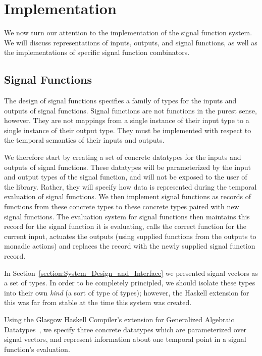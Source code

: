 \section{Implementation}
\label{section:Implementation}

We now turn our attention to the implementation of the signal function
system. We will discuss representations of inputs, outputs, and signal functions,
as well as the implementations of specific signal function combinators.

\subsection{Signal Functions}
\label{subsection:Implementation-Signal_Functions}

The design of signal functions specifies a family of types for the inputs and
outputs of signal functions. Signal functions are not functions in the purest
sense, however. They are not mappings from a single instance of their input
type to a single instance of their output type. They must be implemented with
respect to the temporal semantics of their inputs and outputs.

We therefore start by creating a set of concrete datatypes for the inputs and
outputs of signal functions. These datatypes will be parameterized by the input
and output types of the signal function, and will not be exposed to the user of
the library. Rather, they will specify how data is represented during the
temporal evaluation of signal functions. We then implement signal functions
as records of functions from these concrete types to these concrete types paired
with new signal functions. The evaluation system for signal functions then
maintains this record for the signal function it is evaluating, calls the
correct function for the current input, actuates the outputs (using supplied
functions from the outputs to monadic actions) and replaces the record with the
newly supplied signal function record.

In Section~\ref{section:System_Design_and_Interface} we presented signal vectors
as a set of types. In order to be completely principled, we should isolate these
types into their own {\em kind} (a sort of type of types); however, the Haskell
extension for this was far from stable at the time this system was created.

Using the Glasgow Haskell Compiler's extension for Generalized Algebraic
Datatypes~\cite{Cheney2003,Xi2003,PeytonJones2006}, we specify three concrete
datatypes which are parameterized over signal vectors, and represent
information about one temporal point in a signal function's evaluation.

